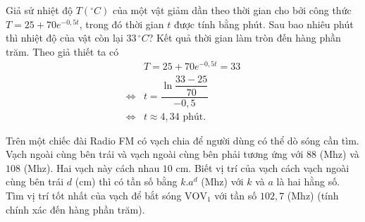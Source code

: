 \begin{ex}%
	Giả sử nhiệt độ $T({}^\circ C)$ của một vật giảm dần theo thời gian cho bởi công thức $T = 25 + 70e^{-0{,}5t}$, trong đó thời gian $t$ được tính bằng phút. Sau bao nhiêu phút thì nhiệt độ của vật còn lại $33\, {}^\circ C$? Kết quả thời gian làm tròn đến hàng phần trăm.
	\loigiai
	{
		Theo giả thiết ta có
		\begin{align*}
			&T = 25 + 70e^{-0{,}5t} = 33\\
			\Leftrightarrow &t = \dfrac{\ln\dfrac{33-25}{70}}{-0{,}5}\\
			\Leftrightarrow &t \approx 4{,}34 \text{ phút}.
		\end{align*}
	}
\end{ex}

\begin{ex}%
	Trên một chiếc đài Radio FM có vạch chia để người dùng có thể dò sóng cần tìm. Vạch ngoài cùng bên trái và vạch ngoài cùng bên phải tương ứng với $88$ (Mhz) và $108$ (Mhz). Hai vạch này cách nhau $10$ cm. Biết vị trí của vạch cách vạch ngoài cùng bên trái $d$ (cm) thì có tần số bằng $k.a^d$ (Mhz) với $k$ và $a$ là hai hằng số. Tìm vị trí tốt nhất của vạch để bắt sóng $\mathrm{VOV}_1$ với tần số $102,7$ (Mhz) (tính chính xác đến hàng phần trăm).
\end{ex}

